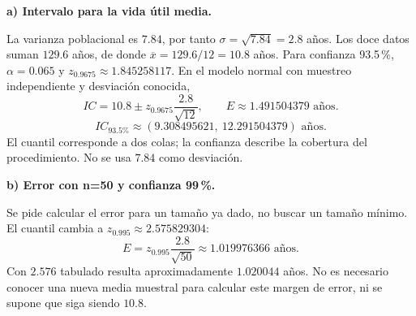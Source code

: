\textbf{a) Intervalo para la vida útil media.}\par\nopagebreak[4]
La varianza poblacional es $7.84$, por tanto $\sigma=\sqrt{7.84}=2.8$ años. Los doce datos suman $129.6$ años, de donde $\overline x=129.6/12=10.8$ años.
Para confianza 93.5\,\%, $\alpha=0.065$ y $z_{0.9675}\approx1.845258117$. En el modelo normal con muestreo independiente y desviación conocida,
\[
IC=10.8\pm z_{0.9675}\frac{2.8}{\sqrt{12}},\qquad E\approx1.491504379\text{ años}.
\]
\[
\boxed{IC_{\text{93.5\%}}\approx(9.308495621,\ 12.291504379)\text{ años}.}
\]
El cuantil corresponde a dos colas; la confianza describe la cobertura del procedimiento. No se usa $7.84$ como desviación.

\textbf{b) Error con n=50 y confianza 99\,\%.}\par\nopagebreak[4]
Se pide calcular el error para un tamaño ya dado, no buscar un tamaño mínimo. El cuantil cambia a $z_{0.995}\approx2.575829304$:
\[
\boxed{E=z_{0.995}\frac{2.8}{\sqrt{50}}\approx1.019976366\text{ años}.}
\]
Con $2.576$ tabulado resulta aproximadamente $1.020044$ años. No es necesario conocer una nueva media muestral para calcular este margen de error, ni se supone que siga siendo $10.8$.
